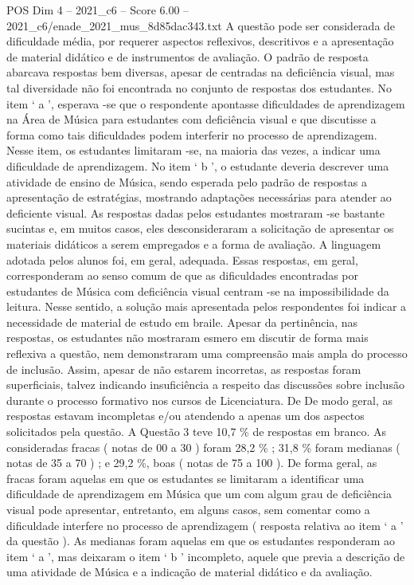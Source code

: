 \begin{textsample}{POS Dim 4 – 2021\_c6 – Score 6.00 – 2021\_c6/enade\_2021\_mus\_8d85dac343.txt}
A questão pode ser considerada de dificuldade média, por requerer aspectos reflexivos, descritivos e a apresentação de material didático e de instrumentos de avaliação.
O padrão de resposta abarcava respostas bem diversas, apesar de centradas na deficiência visual, mas tal diversidade não foi encontrada no conjunto de respostas dos estudantes.
No item ‘ a ’, esperava -se que o respondente apontasse dificuldades de aprendizagem na Área de Música para estudantes com deficiência visual e que discutisse a forma como tais dificuldades podem interferir no processo de aprendizagem.
Nesse item, os estudantes limitaram -se, na maioria das vezes, a indicar uma dificuldade de aprendizagem.
No item ‘ b ’, o estudante deveria descrever uma atividade de ensino de Música, sendo esperada pelo padrão de respostas a apresentação de estratégias, mostrando adaptações necessárias para atender ao deficiente visual.
As respostas dadas pelos estudantes mostraram -se bastante sucintas e, em muitos casos, eles desconsideraram a solicitação de apresentar os materiais didáticos a serem empregados e a forma de avaliação.
A linguagem adotada pelos alunos foi, em geral, adequada.
Essas respostas, em geral, corresponderam ao senso comum de que as dificuldades encontradas por estudantes de Música com deficiência visual centram -se na impossibilidade da leitura.
Nesse sentido, a solução mais apresentada pelos respondentes foi indicar a necessidade de material de estudo em braile.
Apesar da pertinência, nas respostas, os estudantes não mostraram esmero em discutir de forma mais reflexiva a questão, nem demonstraram uma compreensão mais ampla do processo de inclusão.
Assim, apesar de não estarem incorretas, as respostas foram superficiais, talvez indicando insuficiência a respeito das discussões sobre inclusão durante o processo formativo nos cursos de Licenciatura.
De De modo geral, as respostas estavam incompletas e/ou atendendo a apenas um dos aspectos solicitados pela questão.
A Questão 3 teve 10,7 \% de respostas em branco.
As consideradas fracas ( notas de 00 a 30 ) foram 28,2 \% ; 31,8 \% foram medianas ( notas de 35 a 70 ) ; e 29,2 \%, boas ( notas de 75 a 100 ).
De forma geral, as fracas foram aquelas em que os estudantes se limitaram a identificar uma dificuldade de aprendizagem em Música que um com algum grau de deficiência visual pode apresentar, entretanto, em alguns casos, sem comentar como a dificuldade interfere no processo de aprendizagem ( resposta relativa ao item ‘ a ’ da questão ).
As medianas foram aquelas em que os estudantes responderam ao item ‘ a ’, mas deixaram o item ‘ b ’ incompleto, aquele que previa a descrição de uma atividade de Música e a indicação de material didático e da avaliação.

\end{textsample}
